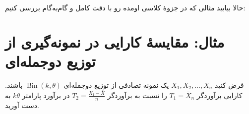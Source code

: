 \documentclass[12pt,a4paper,oneside]{report}
\begin{document}
حالا بیایید مثالی که در جزوهٔ کلاسی اومده رو با دقت کامل و گام‌به‌گام بررسی کنیم:

\section*{مثال: مقایسهٔ کارایی در نمونه‌گیری از توزیع دوجمله‌ای}

\begin{question}
فرض کنید $X_1, X_2, \dots, X_n$ یک نمونه تصادفی از توزیع دوجمله‌ای $\operatorname{Bin}(k, \theta)$ باشند. کارایی برآوردگر $T_1 = \bar{X}_n$ را نسبت به برآوردگر $T_2 = \frac{X_1 - \bar{X}}{n}$ در برآورد پارامتر $k\theta$ به دست آورید.
\end{question}
\end{document}
